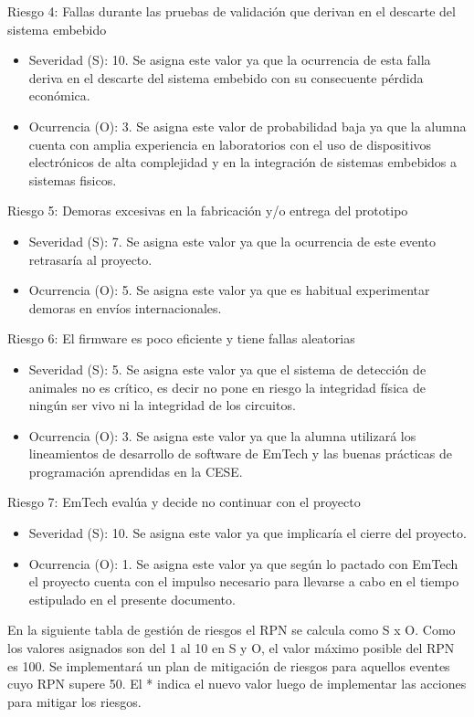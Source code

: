 \documentclass[
11pt, %
]{charter}
\begin{document}
Riesgo 4: Fallas durante las pruebas de validación que derivan en el descarte del sistema embebido
\begin{itemize}
	\item Severidad (S): 10. Se asigna este valor ya que la ocurrencia de esta falla deriva en el descarte del sistema embebido con su consecuente pérdida económica.
	\item Ocurrencia (O): 3. Se asigna este valor de probabilidad baja ya que la alumna cuenta con amplia experiencia en laboratorios con el uso de dispositivos electrónicos de alta complejidad y en la integración de sistemas embebidos a sistemas fisicos.
\end{itemize}

Riesgo 5: Demoras excesivas en la fabricación y/o entrega del prototipo
\begin{itemize}
	\item Severidad (S): 7. Se asigna este valor ya que la ocurrencia de este evento retrasaría al proyecto.
	\item Ocurrencia (O): 5. Se asigna este valor ya que es habitual experimentar demoras en envíos internacionales.
\end{itemize}

Riesgo 6: El firmware es poco eficiente y tiene fallas aleatorias
\begin{itemize}
	\item Severidad (S): 5. Se asigna este valor ya que el sistema de detección de animales no es crítico, es decir no pone en riesgo la integridad física de ningún ser vivo ni la integridad de los circuitos.
	\item Ocurrencia (O): 3. Se asigna este valor ya que la alumna utilizará los lineamientos de desarrollo de software de EmTech y las buenas prácticas de programación aprendidas en la CESE. 
\end{itemize}

Riesgo 7: EmTech evalúa y decide no continuar con el proyecto
\begin{itemize}
	\item Severidad (S): 10. Se asigna este valor ya que implicaría el cierre del proyecto. 
	\item Ocurrencia (O): 1. Se asigna este valor ya que según lo pactado con EmTech el proyecto cuenta con el impulso necesario para llevarse a cabo en el tiempo estipulado en el presente documento. 
\end{itemize}

\newpage
En la siguiente tabla de gestión de riesgos el RPN se calcula como S x O. Como los valores asignados son del 1 al 10 en S y O, el valor máximo posible del RPN es 100. Se implementará un plan de mitigación de riesgos para aquellos eventes cuyo RPN supere 50. El * indica el nuevo valor luego de implementar las acciones para mitigar los riesgos. 
\end{document}
